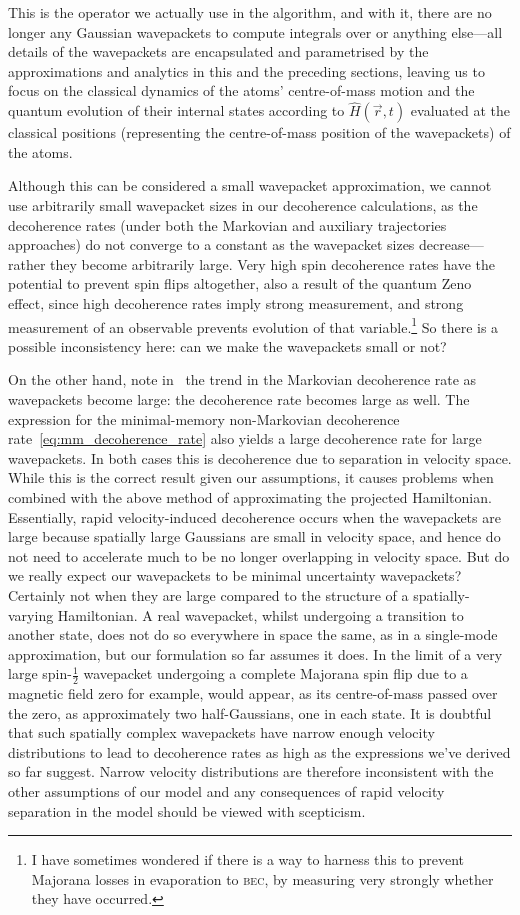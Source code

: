 This is the operator we actually use in the algorithm, and with it, there are no longer any Gaussian wavepackets to compute integrals over or anything else---all details of the wavepackets are encapsulated and parametrised by the approximations and analytics in this and the preceding sections, leaving us to focus on the classical dynamics of the atoms' centre-of-mass motion and the quantum evolution of their internal states according to $\hat H(\vec r, t)$ evaluated at the classical positions (representing the centre-of-mass position of the wavepackets) of the atoms.

Although this can be considered a small wavepacket approximation, we cannot use arbitrarily small wavepacket sizes in our decoherence calculations, as the decoherence rates (under both the Markovian and auxiliary trajectories approaches) do not converge to a constant as the wavepacket sizes decrease---rather they become arbitrarily large. Very high spin decoherence rates have the potential to prevent spin flips altogether, also a result of the quantum Zeno effect, since high decoherence rates imply strong measurement, and strong measurement of an observable prevents evolution of that variable.\footnote{I have sometimes wondered if there is a way to harness this to prevent Majorana losses in evaporation to \textsc{bec}, by measuring very strongly whether they have occurred.} So there is a possible inconsistency here: can we make the wavepackets small or not?

On the other hand, note in~ the trend in the Markovian decoherence rate as wavepackets become large: the decoherence rate becomes large as well. The expression for the minimal-memory non-Markovian decoherence rate~\eqref{eq:mm_decoherence_rate} also yields a large decoherence rate for large wavepackets. In both cases this is decoherence due to separation in velocity space. While this is the correct result given our assumptions, it causes problems when combined with the above method of approximating the projected Hamiltonian. Essentially, rapid velocity-induced decoherence occurs when the wavepackets are large because spatially large Gaussians are small in velocity space, and hence do not need to accelerate much to be no longer overlapping in velocity space. But do we really expect our wavepackets to be minimal uncertainty wavepackets? Certainly not when they are large compared to the structure of a spatially-varying Hamiltonian. A real wavepacket, whilst undergoing a transition to another state, does not do so everywhere in space the same, as in a single-mode approximation, but our formulation so far assumes it does. In the limit of a very large spin-$\frac12$ wavepacket undergoing a complete Majorana spin flip due to a magnetic field zero for example, would appear, as its centre-of-mass passed over the zero, as approximately two half-Gaussians, one in each state. It is doubtful that such spatially complex wavepackets have narrow enough velocity distributions to lead to decoherence rates as high as the expressions we've derived so far suggest. Narrow velocity distributions are therefore inconsistent with the other assumptions of our model and any consequences of rapid velocity separation in the model should be viewed with scepticism.

